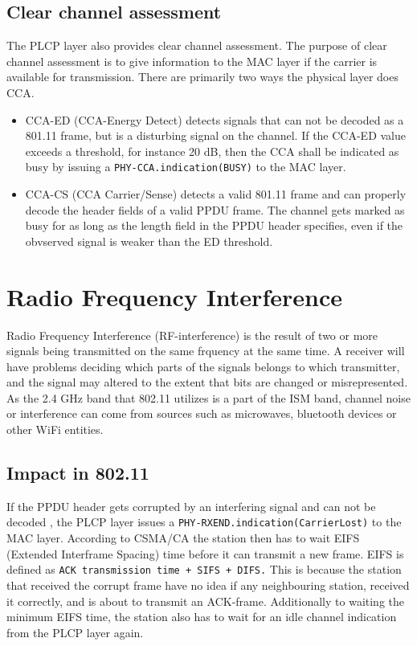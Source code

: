 {	\subsection{Clear channel assessment}
	The PLCP layer also provides clear channel assessment.
	The purpose of clear channel assessment is to give information to the MAC
	layer if the carrier is available for transmission. There
	are primarily two ways the physical layer does CCA.
	\begin{itemize}
	\item CCA-ED (CCA-Energy Detect) detects signals that can not be decoded as a 801.11 frame, but is a disturbing signal on the channel. If the CCA-ED value
	exceeds a threshold, for instance 20 dB, then the CCA shall be indicated as
	busy by issuing a \verb|PHY-CCA.indication(BUSY)| to the MAC layer.  
	\item CCA-CS (CCA Carrier/Sense) detects a valid 801.11 frame and can
	properly decode the header fields of a valid PPDU frame.
	The channel gets marked as busy for as long as the length
	field in the PPDU header specifies, even if the obvserved
	signal is weaker than the ED threshold. 
	\end{itemize}

	\section{Radio Frequency Interference}
	Radio Frequency Interference (RF-interference) is the result
	of two or more signals being transmitted on the same frquency at the same time.
	A receiver will have problems deciding which parts of the signals 
	belongs to which transmitter, and the signal may altered to the extent
	that bits are changed or misrepresented. As the 2.4 GHz band that 802.11
	utilizes is a part of the ISM band, channel noise or interference
	can come from sources such as microwaves, bluetooth devices or other
	WiFi entities.

	\subsection{Impact in 802.11}If the PPDU header
	gets corrupted by an interfering signal and can not be decoded
	, the PLCP layer issues a \verb|PHY-RXEND.indication(CarrierLost)|
	to the MAC layer. According to CSMA/CA the station then has to
	wait EIFS (Extended Interframe Spacing) time before
	it can transmit a new frame. EIFS is defined as
	\verb|ACK transmission time + SIFS + DIFS.| This is because the station that received the corrupt frame have no idea if any neighbouring station,
	received it correctly, and is about to transmit an ACK-frame. Additionally
	to waiting the minimum EIFS time, the station also has to wait for
	an idle channel indication from the PLCP layer again. %

}
